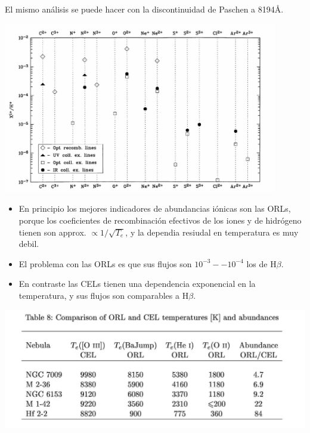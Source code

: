 El mismo an\'alisis se puede hacer con la discontinuidad de Paschen a
8194\AA.



\begin{center}
      \includegraphics[width=0.9\textwidth,height=!]{ORL_CEL_general.jpg}
\end{center}



\begin{itemize}
\item En principio los mejores indicadores de abundancias i\'onicas son las
ORLs, porque los coeficientes de recombinaci\'on efectivos de los
iones y de hidr\'ogeno tienen son approx. $\propto 1/\sqrt{T_e}$, y la
dependia resiudal en temperatura es muy debil. 

\item El problema con las ORLs es que sus flujos son $10^{-3} --
10^{-4}$ los de H$\beta$.

\item En contraste las CELs tienen una dependencia exponencial en la
temperatura, y sus flujos son comparables a H$\beta$. 

\end{itemize}


\begin{center}
      \includegraphics[width=\textwidth,height=!]{orl_cel_table.jpg}
\end{center}


